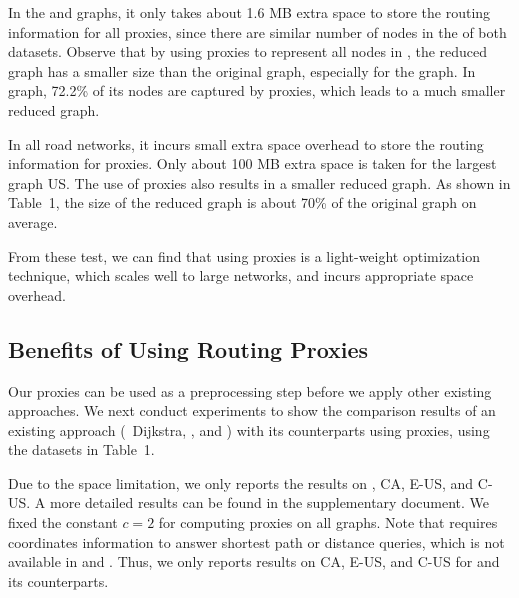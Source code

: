 In the \dblp and \dblpone graphs, it only takes about 1.6 MB extra space to store the routing information for all proxies, since there are similar number of nodes in the \dras of both datasets. Observe that by using proxies to represent all nodes in \dras, the reduced graph  has a smaller size than the original graph, especially for the \dblpone graph. In \dblpone graph, 72.2\% of its nodes are captured by proxies, which leads to a much smaller reduced graph.

In all road networks, it incurs small extra space overhead to store the routing information for proxies. Only about 100 MB extra space is taken for the largest graph US. The use of proxies also results in a smaller reduced graph. As shown in Table~1, the size of the reduced graph is about 70\% of the original graph on average.



From these test, we can find that using proxies is a light-weight optimization technique, which scales well to large networks, and incurs appropriate space overhead. %

\subsection{Benefits of Using Routing Proxies}
Our proxies can be used as a preprocessing step before we apply other existing approaches. 
We next conduct experiments to show the comparison results of an existing approach (\ie \ Dijkstra, \arcflag, \tnr and \ah) with its counterparts using proxies, using the datasets in Table~1.



Due to the space limitation, we only reports the results on \dblpone, CA, E-US, and C-US. A more detailed results can be found in the supplementary document. We fixed the constant $c = 2$ for computing proxies on all graphs. Note that \ah requires coordinates information to answer shortest path or distance queries, which is not available in \dblp and \dblpone. Thus, we only reports results on CA, E-US, and C-US for \ah and its counterparts.




